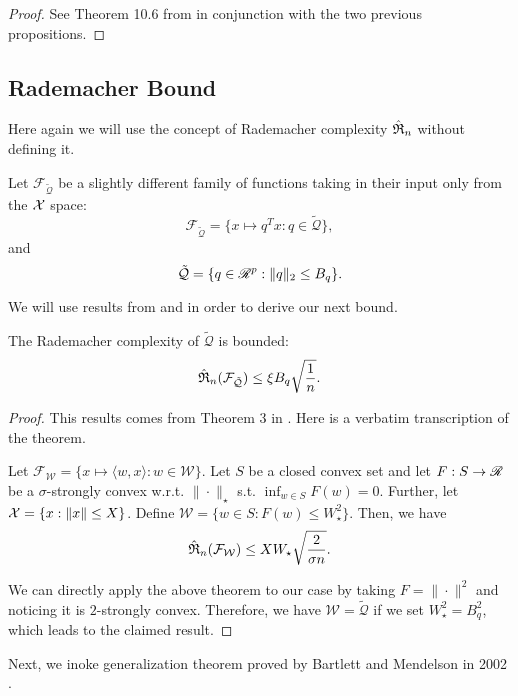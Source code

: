 \documentclass{article}
\begin{document}
\begin{proof}
  See Theorem 10.6 from \cite{mohri2012foundations} in conjunction with the two previous propositions. 
\end{proof}

\subsection{Rademacher Bound}

Here again we will use the concept of Rademacher complexity $\hat{\mathfrak{R}}_n$ without defining it.

Let $\mathcal{F}_{\tilde{\mathcal{Q}}}$ be a slightly different family of functions taking
in their input only from the $\mathcal{X}$ space:
\[
  \mathcal{F}_{\tilde{\mathcal{Q}}} = \{x\mapsto q^Tx:q\in\tilde{\mathcal{Q}}\},
\]
and
\[
  \tilde{\mathcal{Q}} = \{q \in \mathscr{R}^p:\|q\|_2 \leq B_q\}.
\]

We will use results from \cite{kakade2009complexity} and \cite{bartlett2002rademacher} in
order to derive our next bound.

\begin{lemma*}
  \label{rad_lemma}
  The Rademacher complexity of $\tilde{\mathcal{Q}}$ is bounded:
  \[
    \hat{\mathfrak{R}}_n(\mathcal{F}_{\tilde{\mathcal{Q}}}) \leq \xi B_q\sqrt{\frac{1}{n}}.
  \]
\end{lemma*}
\begin{proof}
  This results comes from Theorem 3 in \cite{kakade2009complexity}. Here is a verbatim
  transcription of the theorem.
  \begin{thm*}
    Let $\mathcal{F}_{\mathcal{W}} = \{x\mapsto\langle w,x\rangle: w\in\mathcal{W}\}$.
    Let $S$ be a closed convex set and let $F:S\to\mathscr{R}$ be a $\sigma$-strongly convex
    w.r.t. $\|\cdot\|_{\star}$ s.t. $\inf_{w\in S}F(w)=0$. Further, let
    $\mathcal{X} = \{x:\|x\|\leq X\}$. Define $\mathcal{W} = \{w\in S: F(w) \leq
    W^2_\star\}$. Then, we have
    \[
      \hat{\mathfrak{R}}_n(\mathcal{F}_{\mathcal{W}}) \leq XW_\star\sqrt{\frac{2}{\sigma n}}.
    \]
  \end{thm*}

  We can directly apply the above theorem to our case by taking $F = \|\cdot\|^2$ and
  noticing it is $2$-strongly convex. Therefore, we have
  $\mathcal{W} = \tilde{\mathcal{Q}}$ if we set $W_\star^2=B_q^2$, which leads to the
  claimed result.
\end{proof}

Next, we inoke generalization theorem proved by Bartlett and Mendelson in 2002
\cite{bartlett2002rademacher}.
\end{document}

